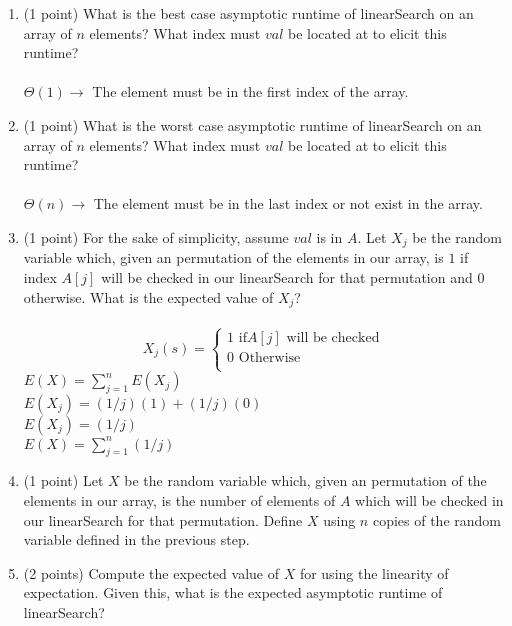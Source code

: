 \documentclass[12pt]{elsart}
\begin{document}
\begin{enumerate}
 \item (1 point) What is the best case asymptotic runtime of linearSearch on an array of $n$ elements?  What index must $val$ be located at to elicit this runtime?\\\\
	$\boxed{\Theta(1)}\rightarrow$ The element must be in the first index of the array.\\
 \item (1 point) What is the worst case asymptotic runtime of linearSearch on an array of $n$ elements?  What index must $val$ be located at to elicit this runtime?\\\\
	$\boxed{\Theta(n)}\rightarrow$ The element must be in the last index or not exist in the array.\\
\newpage
 \item (1 point) For the sake of simplicity, assume $val$ is in $A$.  Let $X_j$ be the random variable which, given an permutation of the elements in our array, is $1$ if index $A[j]$ will be checked in our linearSearch for that permutation and $0$ otherwise.  What is the expected value of $X_j$?\\\\
	\begin{equation}
		X_j(s)=
		\begin{cases}
      			1 \text{ if} A[j] \text{ will be checked} \\
      			0 \text{ Otherwise}\\
    		\end{cases}
	\end{equation}
	$E(X)=\sum\limits_{j=1}^n E(X_j)$\\
	$E(X_j)= (1/j)(1) + (1/j)(0)$\\
	$E(X_j)=(1/j)$\\
	$\boxed{E(X)=\sum\limits_{j=1}^n(1/j)}$\\
 \item (1 point) Let $X$ be the random variable which, given an permutation of the elements in our array,  is the number of elements of $A$ which will be checked in our linearSearch for that permutation.  Define $X$ using $n$ copies of the random variable defined in the previous step.
 \item (2 points) Compute the expected value of $X$ for using the linearity of expectation. Given this, what is the expected asymptotic runtime of linearSearch?
\end{enumerate}
\end{document}
